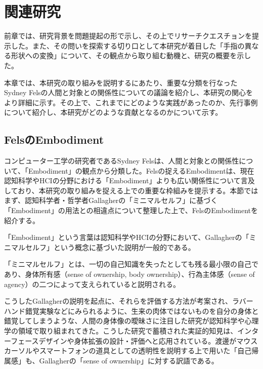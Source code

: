 \chapter{関連研究}
\label{related_works}

前章では、研究背景を問題提起の形で示し、その上でリサーチクエスチョンを提示した。また、その問いを探索する切り口として本研究が着目した「手指の異なる形状への変換」について、その観点から取り組む動機と、研究の概要を示した。

本章では、本研究の取り組みを説明するにあたり、重要な分類を行なったSydney Felsの人間と対象との関係性についての議論を紹介し、本研究の関心をより詳細に示す。その上で、これまでにどのような実践があったのか、先行事例について紹介し、本研究がどのような貢献となるのかについて示す。

\section{FelsのEmbodiment}
コンピューター工学の研究者であるSydney Felsは、人間と対象との関係性について、「Embodiment」の観点から分類した。Felsの捉えるEmbodimentは、現在認知科学やHCIの分野における「Embodiment」よりも広い関係性について言及しており、本研究の取り組みを捉える上での重要な枠組みを提示する。本節ではまず、認知科学者・哲学者Gallagherの「ミニマルセルフ」に基づく「Embodiment」の用法との相違点について整理した上で、FelsのEmbodimentを紹介する。

「Embodiment」という言葉は認知科学やHCIの分野において、Gallagherの「ミニマルセルフ」という概念に基づいた説明が一般的である。

「ミニマルセルフ」とは、一切の自己知識を失ったとしても残る最小限の自己であり、身体所有感（sense of
ownership, body ownership）、行為主体感（sense of agency）の二つによって支えられていると説明される\cite{Gallagher2000}。

こうしたGallagherの説明を起点に、それらを評価する方法が考案され、ラバーハンド錯覚実験などにみられるように、生来の肉体ではないものを自分の身体と錯覚してしまうような、人間の身体像の曖昧さに注目した研究が認知科学や心理学の領域で取り組まれてきた\cite{braun2018senses}。こうした研究で蓄積された実証的知見は、インターフェースデザインや身体拡張の設計・評価へと応用されている。渡邊がマウスカーソルやスマートフォンの道具としての透明性を説明する上で用いた「自己帰属感」も、Gallagherの「sense of ownership」に対する訳語である\cite{Watanabe2017}。

